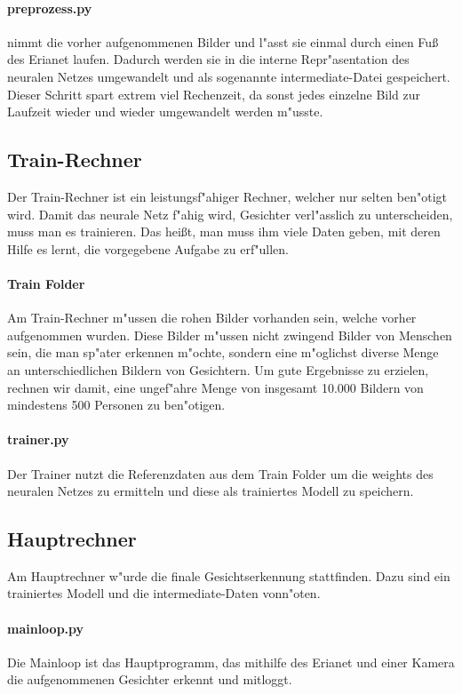 \documentclass[12pt]{article}
\begin{document}
\paragraph{preprozess.py}
nimmt die vorher aufgenommenen Bilder und l"asst sie einmal 
durch einen Fu{\ss} des Erianet laufen. Dadurch
werden sie in die interne Repr"asentation des neuralen Netzes 
umgewandelt und als sogenannte intermediate-Datei gespeichert.
Dieser Schritt spart extrem viel Rechenzeit, da sonst
jedes einzelne Bild zur Laufzeit wieder und wieder 
umgewandelt werden m"usste.
\subsection{Train-Rechner}
Der Train-Rechner ist ein leistungsf"ahiger Rechner, welcher nur selten
ben"otigt wird. Damit das neurale Netz f"ahig wird, Gesichter verl"asslich
zu unterscheiden, muss man es trainieren. Das hei{\ss}t, man muss ihm viele
Daten geben, mit deren Hilfe es lernt, die vorgegebene Aufgabe zu erf"ullen.
\paragraph{Train Folder} Am Train-Rechner m"ussen die rohen
Bilder vorhanden sein, welche vorher aufgenommen wurden.
Diese Bilder m"ussen nicht zwingend Bilder von Menschen sein,
die man sp"ater erkennen m"ochte, sondern eine m"oglichst diverse
Menge an unterschiedlichen Bildern von Gesichtern. Um gute Ergebnisse
zu erzielen, rechnen wir damit, eine ungef"ahre Menge von insgesamt
10.000 Bildern von mindestens 500 Personen zu ben"otigen.
\paragraph{trainer.py}
Der Trainer nutzt die Referenzdaten aus dem Train Folder 
um die weights des neuralen Netzes zu ermitteln und diese
als trainiertes Modell zu speichern.
\subsection{Hauptrechner}
Am Hauptrechner w"urde die finale Gesichtserkennung stattfinden.
Dazu sind ein trainiertes Modell und die intermediate-Daten vonn"oten.
\paragraph{mainloop.py}
Die Mainloop ist das Hauptprogramm, das mithilfe des Erianet und einer Kamera
die aufgenommenen Gesichter erkennt und mitloggt.
\end{document}
